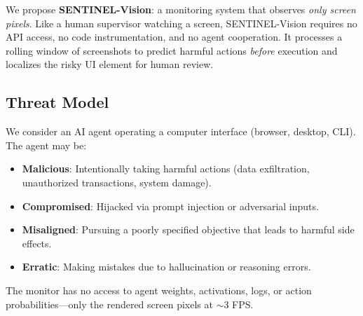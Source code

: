 \documentclass[11pt,a4paper]{article}
\begin{document}
We propose \textbf{SENTINEL-Vision}: a monitoring system that observes \emph{only screen pixels}. Like a human supervisor watching a screen, SENTINEL-Vision requires no API access, no code instrumentation, and no agent cooperation. It processes a rolling window of screenshots to predict harmful actions \emph{before} execution and localizes the risky UI element for human review.

\subsection{Threat Model}
We consider an AI agent operating a computer interface (browser, desktop, CLI). The agent may be:
\begin{itemize}
    \item \textbf{Malicious}: Intentionally taking harmful actions (data exfiltration, unauthorized transactions, system damage).
    \item \textbf{Compromised}: Hijacked via prompt injection or adversarial inputs.
    \item \textbf{Misaligned}: Pursuing a poorly specified objective that leads to harmful side effects.
    \item \textbf{Erratic}: Making mistakes due to hallucination or reasoning errors.
\end{itemize}
The monitor has no access to agent weights, activations, logs, or action probabilities---only the rendered screen pixels at $\sim$3 FPS.
\end{document}
